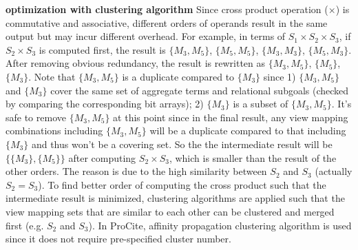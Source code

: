 \textbf{optimization with clustering algorithm} Since cross product operation ($\times$) is commutative and associative, different orders of operands result in the same output but may incur different overhead. For example, in terms of $S_1\times S_2 \times S_3$, if $S_2 \times S_3$ is computed first, the result is $\{M_3, M_5\}$, $\{M_5, M_5\}$, $\{M_3, M_3\}$, $\{M_5, M_3\}$. After removing obvious redundancy, the result is rewritten as $\{M_3, M_5\}$, $\{M_5\}$, $\{M_3\}$. Note that $\{M_3, M_5\}$ is a duplicate compared to $\{M_3\}$ since 1) $\{M_3, M_5\}$ and $\{M_3\}$ cover the same set of aggregate terms and relational subgoals (checked by comparing the corresponding bit arrays); 2) $\{M_3\}$ is a subset of $\{M_3, M_5\}$. It's safe to remove $\{M_3, M_5\}$ at this point since in the final result, any view mapping combinations including $\{M_3, M_5\}$ will be a duplicate compared to that including $\{M_3\}$ and thus won't be a covering set. So the the intermediate result will be $\{\{M_3\}, \{M_5\}\}$ after computing $S_2 \times S_3$, which is smaller than the result of the other orders. The reason is due to the high similarity between $S_2$ and $S_3$ (actually $S_2 = S_3$). To find better order of computing the cross product such that the intermediate result is minimized, clustering algorithms are applied such that the view mapping sets that are similar to each other can be clustered and merged first (e.g. $S_2$ and $S_3$). In ProCite, affinity propagation clustering algorithm \cite{dueck2007non} is used since it does not require pre-specified cluster number.